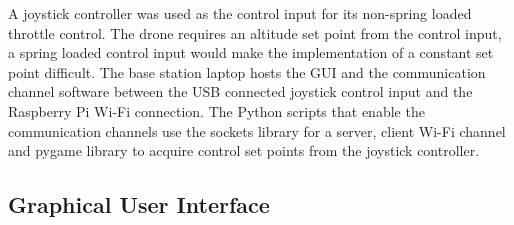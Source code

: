 A joystick controller was used as the control input for its non-spring loaded throttle control. The drone requires an altitude set point from the control input, a spring loaded control input would make the implementation of a constant set point difficult. The base station laptop hosts the GUI and the communication channel software between the USB connected joystick control input and the Raspberry Pi Wi-Fi connection. The Python scripts that enable the communication channels use the sockets library for a server, client Wi-Fi channel and pygame library to acquire control set points from the joystick controller. 


\subsection{Graphical User Interface}

